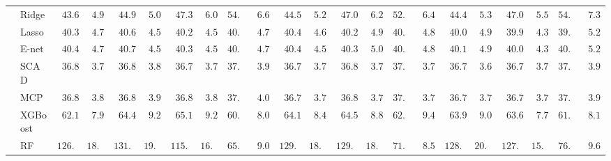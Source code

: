 \begin{tabular}{p{0.2cm}p{1cm}|p{0.6cm}p{0.6cm}|p{0.6cm}p{0.6cm}p{0.6cm}p{0.6cm}p{0.6cm}p{0.6cm}|p{0.6cm}p{0.6cm}p{0.6cm}p{0.6cm}p{0.6cm}p{0.6cm}|p{0.6cm}p{0.6cm}p{0.6cm}p{0.6cm}p{0.6cm}p{0.6cm}}
 & Ridge  & $\phantom{0}43.63$ & $\phantom{0}4.99$ & $\phantom{0}44.93$ & $\phantom{0}5.03$ & $\phantom{0}47.39$ & $\phantom{0}6.01$ & $54.89$ & $\phantom{0}6.61$ & $\phantom{0}44.53$ & $\phantom{0}5.23$ & $\phantom{0}47.08$ & $\phantom{0}6.22$ & $52.84$ & $\phantom{0}6.42$ & $\phantom{0}44.47$ & $\phantom{0}5.36$ & $\phantom{0}47.08$ & $\phantom{0}5.54$ & $54.62$ & $\phantom{0}7.36$ \\
 & Lasso  & $\phantom{0}40.35$ & $\phantom{0}4.71$ & $\phantom{0}40.68$ & $\phantom{0}4.55$ & $\phantom{0}40.26$ & $\phantom{0}4.54$ & $40.28$ & $\phantom{0}4.74$ & $\phantom{0}40.40$ & $\phantom{0}4.62$ & $\phantom{0}40.22$ & $\phantom{0}4.97$ & $40.28$ & $\phantom{0}4.88$ & $\phantom{0}40.03$ & $\phantom{0}4.96$ & $\phantom{0}39.91$ & $\phantom{0}4.35$ & $39.97$ & $\phantom{0}5.25$ \\
 & E-net  & $\phantom{0}40.41$ & $\phantom{0}4.72$ & $\phantom{0}40.75$ & $\phantom{0}4.55$ & $\phantom{0}40.32$ & $\phantom{0}4.57$ & $40.26$ & $\phantom{0}4.79$ & $\phantom{0}40.42$ & $\phantom{0}4.59$ & $\phantom{0}40.31$ & $\phantom{0}5.00$ & $40.33$ & $\phantom{0}4.87$ & $\phantom{0}40.10$ & $\phantom{0}4.92$ & $\phantom{0}40.00$ & $\phantom{0}4.37$ & $40.03$ & $\phantom{0}5.27$ \\
 & SCAD  & $\phantom{0}36.86$ & $\phantom{0}3.78$ & $\phantom{0}36.86$ & $\phantom{0}3.87$ & $\phantom{0}36.78$ & $\phantom{0}3.78$ & $37.31$ & $\phantom{0}3.99$ & $\phantom{0}36.71$ & $\phantom{0}3.74$ & $\phantom{0}36.80$ & $\phantom{0}3.73$ & $37.40$ & $\phantom{0}3.75$ & $\phantom{0}36.78$ & $\phantom{0}3.69$ & $\phantom{0}36.75$ & $\phantom{0}3.75$ & $37.34$ & $\phantom{0}3.93$ \\
 & MCP  & $\phantom{0}36.88$ & $\phantom{0}3.81$ & $\phantom{0}36.89$ & $\phantom{0}3.93$ & $\phantom{0}36.81$ & $\phantom{0}3.81$ & $37.31$ & $\phantom{0}4.01$ & $\phantom{0}36.73$ & $\phantom{0}3.73$ & $\phantom{0}36.81$ & $\phantom{0}3.74$ & $37.48$ & $\phantom{0}3.77$ & $\phantom{0}36.79$ & $\phantom{0}3.74$ & $\phantom{0}36.75$ & $\phantom{0}3.74$ & $37.34$ & $\phantom{0}3.91$ \\
 & XGBoost  & $\phantom{0}62.13$ & $\phantom{0}7.92$ & $\phantom{0}64.48$ & $\phantom{0}9.29$ & $\phantom{0}65.16$ & $\phantom{0}9.26$ & $60.70$ & $\phantom{0}8.03$ & $\phantom{0}64.10$ & $\phantom{0}8.41$ & $\phantom{0}64.53$ & $\phantom{0}8.87$ & $62.70$ & $\phantom{0}9.49$ & $\phantom{0}63.99$ & $\phantom{0}9.03$ & $\phantom{0}63.65$ & $\phantom{0}7.75$ & $61.81$ & $\phantom{0}8.13$ \\
 & RF  & $126.58$ & $18.92$ & $131.48$ & $19.00$ & $115.91$ & $16.03$ & $65.01$ & $\phantom{0}9.07$ & $129.72$ & $18.65$ & $129.29$ & $18.29$ & $71.50$ & $\phantom{0}8.58$ & $128.72$ & $20.24$ & $127.61$ & $15.45$ & $76.65$ & $\phantom{0}9.62$ \\

\end{tabular}
